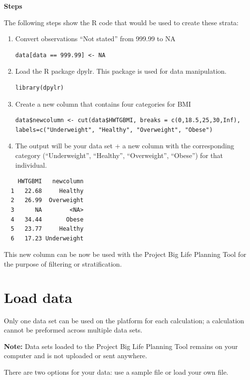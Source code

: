 \documentclass[]{book}
\begin{document}
\textbf{Steps}

The following steps show the R code that would be used to create these
strata:

\begin{enumerate}
\def\labelenumi{\arabic{enumi}.}
\item
  Convert observations ``Not stated'' from 999.99 to NA

\begin{verbatim}
data[data == 999.99] <- NA
\end{verbatim}
\item
  Load the R package dpylr. This package is used for data manipulation.

\begin{verbatim}
library(dpylr)
\end{verbatim}
\item
  Create a new column that contains four categories for BMI

\begin{verbatim}
data$newcolumn <- cut(data$HWTGBMI, breaks = c(0,18.5,25,30,Inf),  labels=c("Underweight", "Healthy", "Overweight", "Obese")
\end{verbatim}
\item
  The output will be your data set + a new column with the corresponding
  category (``Underweight'', ``Healthy'', ``Overweight'', ``Obese'') for
  that individual.
\end{enumerate}

\begin{verbatim}
    HWTGBMI   newcolumn
  1   22.68     Healthy
  2   26.99  Overweight
  3      NA        <NA>
  4   34.44       Obese
  5   23.77     Healthy
  6   17.23 Underweight
\end{verbatim}

This new column can be now be used with the Project Big Life Planning
Tool for the purpose of filtering or stratification.

\section{Load data}\label{load-data}

Only one data set can be used on the platform for each calculation; a
calculation cannot be preformed across multiple data sets.

\textbf{Note:} Data sets loaded to the Project Big Life Planning Tool
remains on your computer and is not uploaded or sent anywhere.

There are two options for your data: use a sample file or load your own
file.
\end{document}
